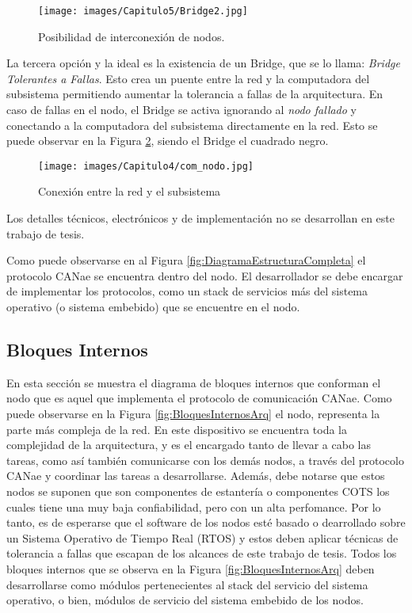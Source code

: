 \begin{figure}[h!]
 \centering
 \texttt{[image: images/Capitulo5/Bridge2.jpg]}
  \caption{Posibilidad de interconexión de nodos.}
\label{fig:Bridge2}
\end{figure} 

La tercera opción y la ideal es la existencia de un Bridge, que se lo llama: 
\textit{Bridge Tolerantes a Fallas}. Esto crea un puente entre la red y la computadora
del subsistema permitiendo aumentar la tolerancia a fallas de la arquitectura. En 
caso de fallas en el nodo, el Bridge se activa ignorando al \textit{nodo fallado} y 
conectando a la computadora del subsistema directamente en la red.  Esto se puede observar
en la Figura \ref{fig:conn_prop}, siendo el Bridge el cuadrado negro.

\begin{figure}[h!]
 \centering
 \texttt{[image: images/Capitulo4/com\_nodo.jpg]}
 \caption{Conexión entre la red y el subsistema}
\label{fig:conn_prop}
\end{figure}

Los detalles técnicos, electrónicos y de implementación no se desarrollan en
este trabajo de tesis. 

Como puede observarse en al Figura \ref{fig:DiagramaEstructuraCompleta} el
protocolo CANae se encuentra dentro del nodo. El desarrollador se debe encargar
de implementar los protocolos, como un stack de servicios más del 
sistema operativo (o sistema embebido) que se encuentre en el nodo.

\subsection{Bloques Internos}
En esta sección se muestra el diagrama de bloques internos que conforman el
nodo que es aquel que implementa el protocolo de comunicación CANae. Como
puede observarse en la Figura \ref{fig:BloquesInternosArq} el nodo, representa
la parte más compleja de la red. En este dispositivo se encuentra toda la
complejidad de la arquitectura, y es el encargado tanto de llevar a cabo
las tareas, como así también comunicarse con los demás nodos, a través del
protocolo CANae y coordinar las tareas a desarrollarse. Además,
debe notarse que estos nodos se suponen que son componentes de estantería
o componentes \ac{COTS} los cuales tiene una muy baja confiabilidad, pero con 
un alta perfomance. Por lo tanto, es de esperarse que el software de los
nodos esté basado o dearrollado sobre un Sistema Operativo de Tiempo
Real (RTOS) y estos deben aplicar técnicas de tolerancia a fallas que
escapan de los alcances de este trabajo de tesis. Todos los bloques
internos que se observa en la Figura \ref{fig:BloquesInternosArq} deben
desarrollarse como módulos pertenecientes al stack del servicio del
sistema operativo, o bien, módulos de servicio del sistema embebido de
los nodos.

